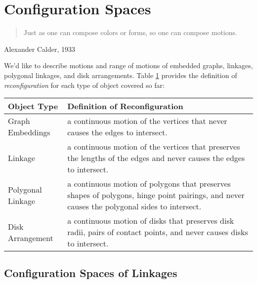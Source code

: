 \section{Configuration Spaces}
\begin{quote}
Just as one can compose colors or forms, so one can compose motions.
\end{quote}
{\raggedright{}Alexander Calder, 1933}

We'd like to describe motions and range of motions of embedded graphs, linkages, polygonal 
linkages, and disk arrangements.  Table \ref{table:configurationSpace-1} provides the definition of 
\textit{reconfiguration} for each type of object covered so far:
\begin{center}
\begin{table}[htbp!]
\begin{tabular}{|p{}|p{}|}
\hline
Object Type&Definition of Reconfiguration\\\hline
Graph Embeddings&a continuous motion of the vertices that never causes the edges to 
intersect.\\\hline
Linkage&a continuous motion of the vertices that preserves the lengths of the edges and never 
causes 
the edges to intersect.\\\hline
Polygonal Linkage&a continuous motion of polygons that preserves shapes of polygons, hinge point 
pairings, and never causes the polygonal sides to intersect.\\\hline
Disk Arrangement&a continuous motion of disks that preserves disk radii, pairs of contact points, 
and never causes disks to intersect.\\\hline
\end{tabular}\label{table:configurationSpace-1}
\end{table}
\end{center}






 \subsection{Configuration Spaces of Linkages}

